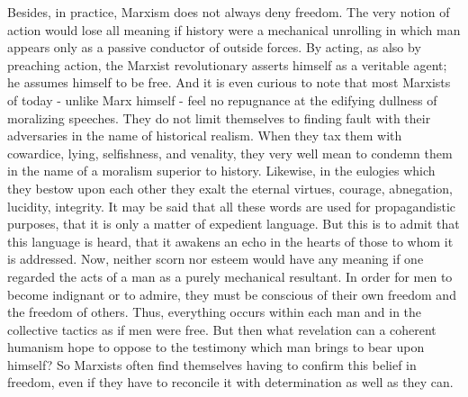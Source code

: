 \documentclass[11pt]{article}
\begin{document}
Besides, in practice, Marxism does not always deny freedom. The very notion of action would lose all meaning if history were a mechanical unrolling in which man appears only as a passive conductor of outside forces. By acting, as also by preaching action, the Marxist revolutionary asserts himself as a veritable agent; he assumes himself to be free. And it is even curious to note that most Marxists of today - unlike Marx himself - feel no repugnance at the edifying dullness of moralizing speeches. They do not limit themselves to finding fault with their adversaries in the name of historical realism. When they tax them with cowardice, lying, selfishness, and venality, they very well mean to condemn them in the name of a moralism superior to history. Likewise, in the eulogies which they bestow upon each other they exalt the eternal virtues, courage, abnegation, lucidity, integrity. It may be said that all these words are used for propagandistic purposes, that it is only a matter of expedient language. But this is to admit that this language is heard, that it awakens an echo in the hearts of those to whom it is addressed. Now, neither scorn nor esteem would have any meaning if one regarded the acts of a man as a purely mechanical resultant. In order for men to become indignant or to admire, they must be conscious of their own freedom and the freedom of others. Thus, everything occurs within each man and in the collective tactics as if men were free. But then what revelation can a coherent humanism hope to oppose to the testimony which man brings to bear upon himself? So Marxists often find themselves having to confirm this belief in freedom, even if they have to reconcile it with determination as well as they can.
\end{document}
